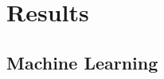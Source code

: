 \section{Results}
\label{sec:results}



\subsection{}
\label{sec:results1}


\subsection{Machine Learning}
\label{sec:results2}


%
%
